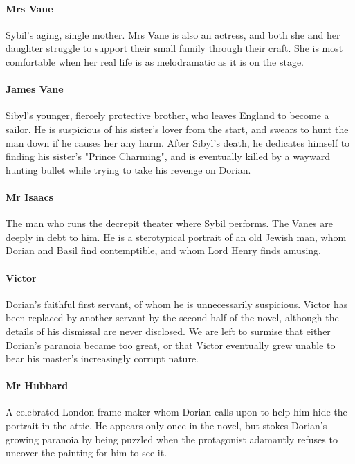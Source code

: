 \documentclass[12pt,twoside,titlepage,a4paper]{article}
\begin{document}
	\paragraph{Mrs Vane} Sybil's aging, single mother. Mrs Vane is also an actress, and both she and her daughter struggle to support their small family through their craft. She is most comfortable when her real life is as melodramatic as it is on the stage.
	
	\paragraph{James Vane} Sibyl's younger, fiercely protective brother, who leaves England to become a sailor. He is suspicious of his sister's lover from the start, and swears to hunt the man down if he causes her any harm. After Sibyl's death, he dedicates himself to finding his sister's "Prince Charming", and is eventually killed by a wayward hunting bullet while trying to take his revenge on Dorian.
	
	\paragraph{Mr Isaacs} The man who runs the decrepit theater where Sybil performs. The Vanes are deeply in debt to him. He is a sterotypical portrait of an old Jewish man, whom Dorian and Basil find contemptible, and whom Lord Henry finds amusing.
	
	\paragraph{Victor} Dorian's faithful first servant, of whom he is unnecessarily suspicious. Victor has been replaced by another servant by the second half of the novel, although the details of his dismissal are never disclosed. We are left to surmise that either Dorian's paranoia became too great, or that Victor eventually grew unable to bear his master's increasingly corrupt nature.
	
	\paragraph{Mr Hubbard}A celebrated London frame-maker whom Dorian calls upon to help him hide the portrait in the attic. He appears only once in the novel, but stokes Dorian's growing paranoia by being puzzled when the protagonist adamantly refuses to uncover the painting for him to see it.
	
\end{document}

